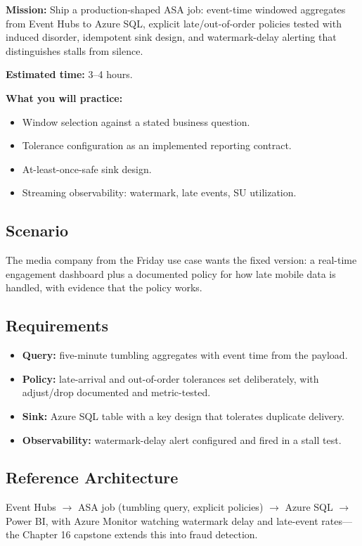 \begin{capstonebox}
\textbf{Mission:} Ship a production-shaped ASA job: event-time windowed aggregates from Event Hubs to Azure SQL, explicit late/out-of-order policies tested with induced disorder, idempotent sink design, and watermark-delay alerting that distinguishes stalls from silence.

\textbf{Estimated time:} 3--4 hours.

\textbf{What you will practice:}
\begin{itemize}
    \item Window selection against a stated business question.
    \item Tolerance configuration as an implemented reporting contract.
    \item At-least-once-safe sink design.
    \item Streaming observability: watermark, late events, SU utilization.
\end{itemize}
\end{capstonebox}

\subsection*{Scenario}
The media company from the Friday use case wants the fixed version: a real-time engagement dashboard plus a documented policy for how late mobile data is handled, with evidence that the policy works.

\subsection*{Requirements}
\begin{itemize}
    \item \textbf{Query:} five-minute tumbling aggregates with event time from the payload.
    \item \textbf{Policy:} late-arrival and out-of-order tolerances set deliberately, with adjust/drop documented and metric-tested.
    \item \textbf{Sink:} Azure SQL table with a key design that tolerates duplicate delivery.
    \item \textbf{Observability:} watermark-delay alert configured and fired in a stall test.
\end{itemize}

\subsection*{Reference Architecture}
Event Hubs $\rightarrow$ ASA job (tumbling query, explicit policies) $\rightarrow$ Azure SQL $\rightarrow$ Power BI, with Azure Monitor watching watermark delay and late-event rates---the Chapter 16 capstone extends this into fraud detection.


